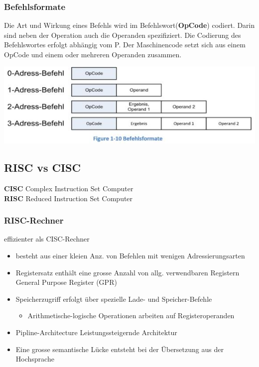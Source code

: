 \subsubsection{Befehlsformate}
\begin{multicols}{2}
\begin{minipage}{\linewidth}
Die Art und Wirkung eines Befehls wird im Befehlswort(\textbf{OpCode}) codiert.
Darin sind neben der Operation auch die Operanden spezifiziert.
Die Codierung des Befehlswortes erfolgt abhängig vom \mu P.
Der Maschinencode setzt sich aus einem OpCode und einem oder mehreren Operanden zusammen.
\end{minipage}

\includegraphics[width=\linewidth]{images/Befehlsformate}
\end{multicols}


\subsection{RISC vs CISC}
\begin{multicols}{2}
    \textbf{CISC}\newline
    Complex Instruction Set Computer
    \\
    \textbf{RISC}\newline
    Reduced Instruction Set Computer
\end{multicols}
\subsubsection{RISC-Rechner}
effizienter als CISC-Rechner
\begin{itemize}
    \item besteht aus einer kleien Anz. von Befehlen mit wenigen Adressierungsarten
    \item Registersatz enthält eine grosse Anzahl von allg. verwendbaren Registern\newline
    General Purpose Register (GPR)
    \item Speicherzugriff erfolgt über spezielle Lade- und Speicher-Befehle
    \begin{itemize}
        \item Arithmetische-logische Operationen arbeiten auf Registeroperanden
    \end{itemize}
    \item Pipline-Architecture \leftarrow Leistungssteigernde Architektur
    \item Eine grosse semantische Lücke entsteht bei der Übersetzung aus der Hochsprache
\end{itemize}

